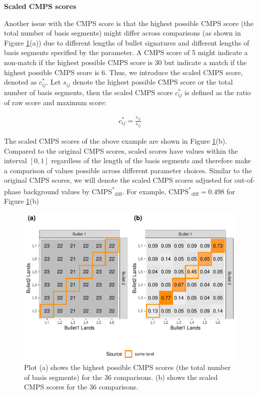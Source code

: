 \textbf{Scaled CMPS scores}

Another issue with the CMPS score is that the highest possible CMPS
score (the total number of basis segments) might differ across
comparisons (as shown in Figure \ref{fig:tiles2}(a)) due to different
lengths of bullet signatures and different lengths of basis segments
specified by the parameter. A CMPS score of 5 might indicate a non-match
if the highest possible CMPS score is 30 but indicate a match if the
highest possible CMPS score is 6. Thus, we introduce the scaled CMPS
score, denoted as \(c^*_{ij}\). Let \(s_{ij}\) denote the highest
possible CMPS score or the total number of basis segments, then the
scaled CMPS score \(c^*_{ij}\) is defined as the ratio of raw score and
maximum score:

\begin{align}
c^*_{ij} = \frac{c_{ij}}{s_{ij}}
\end{align}

The scaled CMPS scores of the above example are shown in Figure
\ref{fig:tiles2}(b). Compared to the original CMPS scores, scaled scores
have values within the interval \([0, 1]\) regardless of the length of
the basis segments and therefore make a comparison of values possible
across different parameter choices. Similar to the original CMPS scores,
we will denote the scaled CMPS scores adjusted for out-of-phase
background values by \(\mathrm{\overline{CMPS^*}_{diff}}\). For example,
\(\mathrm{\overline{CMPS^*}_{diff}} = 0.498\) for Figure
\ref{fig:tiles2}(b)

\begin{Schunk}
\begin{figure}

{\centering \includegraphics[width=.7\textwidth]{ju-hofmann_files/figure-latex/tiles2-1} 

}

\caption[Plot (a) shows the highest possible CMPS scores (the total number of basis segments) for the 36 comparisons]{Plot (a) shows the highest possible CMPS scores (the total number of basis segments) for the 36 comparisons. (b) shows the scaled CMPS scores for the 36 comparisons.}\label{fig:tiles2}
\end{figure}
\end{Schunk}

